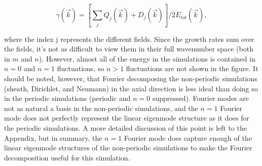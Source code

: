 \documentclass[showpacs,preprintnumbers,amsmath,amssymb,superscriptaddress,aip]{revtex4-1}
\def\beq{\begin{equation}}
\def\eeq{\end{equation}}
\begin{document}
\beq
\label{gamma_def}
\gamma(\vec{k}) = \left[ \sum_j Q_j(\vec{k}) + D_j(\vec{k}) \right] /2 E_{tot}(\vec{k}), 
\eeq

where the index j represents the different fields.
Since the growth rates sum over the fields, it's not as difficult to view them in their full wavenumber space (both in $m$ and $n$). However, almost all of the energy in the simulations is 
contained in $n=0$ and $n=1$ fluctuations, so $n>1$ fluctuations are not shown in the figure. It should be noted, however, that Fourier decomposing the non-periodic simulations (sheath, Dirichlet, and Neumann)
in the axial direction is less ideal than doing so in the periodic simulations (periodic and $n=0$ suppressed). 
Fourier modes are not as natural a basis in the non-periodic simulations, and the $n=1$ Fourier mode does not perfectly represent the linear
eigenmode structure as it does for the periodic simulations. 
A more detailed discussion of this point is left to the Appendix, but in summary, the $n=1$ Fourier mode does capture enough of the
linear eigenmode structures of the non-periodic simulations to make the Fourier decomposition useful for this simulation.
\end{document}
